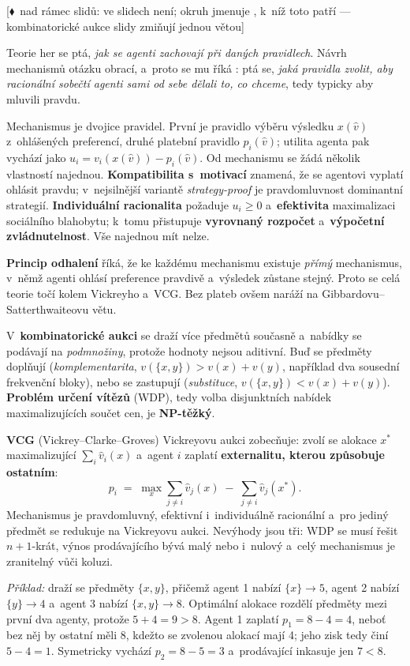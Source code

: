 \documentclass[11pt,a4paper]{article}
\theoremstyle{definition}
\newcommand{\mimoq}[1]{\textcolor{markcol}{\textsf{\footnotesize[$\blacklozenge$~nad rámec slidů: #1]}}}
\begin{document}
\noindent\mimoq{ve slidech není; okruh jmenuje , k~níž toto patří ---
kombinatorické aukce slidy zmiňují jednou větou}

\begin{defbox}
Teorie her se ptá, \emph{jak se agenti zachovají při daných pravidlech}. Návrh mechanismů otázku
obrací, a~proto se mu říká : ptá se, \emph{jaká pravidla zvolit, aby
racionální sobečtí agenti sami od sebe dělali to, co chceme}, tedy typicky aby mluvili pravdu.

Mechanismus je dvojice pravidel. První je pravidlo výběru výsledku $x(\hat v)$ z~ohlášených
preferencí, druhé platební pravidlo $p_i(\hat v)$; utilita agenta pak vychází jako
$u_i = v_i(x(\hat v)) - p_i(\hat v)$. Od mechanismu se žádá několik vlastností najednou.
\textbf{Kompatibilita s~motivací} znamená, že se agentovi vyplatí ohlásit pravdu; v~nejsilnější
variantě \emph{strategy-proof} je pravdomluvnost dominantní strategií. \textbf{Individuální
racionalita} požaduje $u_i \ge 0$ a~\textbf{efektivita} maximalizaci sociálního blahobytu;
k~tomu přistupuje \textbf{vyrovnaný rozpočet} a~\textbf{výpočetní zvládnutelnost}.
Vše najednou mít nelze.

\textbf{Princip odhalení} říká, že ke každému mechanismu existuje \emph{přímý} mechanismus,
v~němž agenti ohlásí preference pravdivě a~výsledek zůstane stejný. Proto se celá teorie točí
kolem Vickreyho a~VCG. Bez plateb ovšem naráží na Gibbardovu--Satterthwaiteovu větu.
\end{defbox}

\begin{defbox}
V~\textbf{kombinatorické aukci} se draží více předmětů současně a~nabídky se podávají na
\emph{podmnožiny}, protože hodnoty nejsou aditivní. Buď se předměty doplňují
(\emph{komplementarita}, $v(\{x,y\}) > v(x)+v(y)$, například dva sousední frekvenční bloky),
nebo se zastupují (\emph{substituce}, $v(\{x,y\}) < v(x)+v(y)$). \textbf{Problém určení vítězů}
(WDP), tedy volba disjunktních nabídek maximalizujících součet cen, je \textbf{NP-těžký}.

\textbf{VCG} (Vickrey--Clarke--Groves) Vickreyovu aukci zobecňuje: zvolí se alokace $x^*$
maximalizující $\sum_i \hat v_i(x)$ a~agent $i$ zaplatí \textbf{externalitu, kterou způsobuje
ostatním}:
\[
p_i \;=\; \max_{x} \sum_{j \ne i} \hat v_j(x) \;-\; \sum_{j \ne i} \hat v_j(x^*) .
\]
Mechanismus je pravdomluvný, efektivní i~individuálně racionální a~pro jediný předmět se
redukuje na Vickreyovu aukci. Nevýhody jsou tři: WDP se musí řešit $n{+}1$-krát, výnos
prodávajícího bývá malý nebo i~nulový a~celý mechanismus je zranitelný vůči koluzi.

\emph{Příklad:} draží se předměty $\{x,y\}$, přičemž agent 1 nabízí $\{x\}\to5$, agent 2 nabízí
$\{y\}\to4$ a~agent 3 nabízí $\{x,y\}\to8$. Optimální alokace rozdělí předměty mezi první dva
agenty, protože $5+4=9 > 8$. Agent 1 zaplatí $p_1 = 8 - 4 = 4$, neboť bez něj by ostatní měli 8,
kdežto se zvolenou alokací mají 4; jeho zisk tedy činí $5-4=1$. Symetricky vychází
$p_2 = 8-5 = 3$ a~prodávající inkasuje jen $7 < 8$.
\end{defbox}
\end{document}

